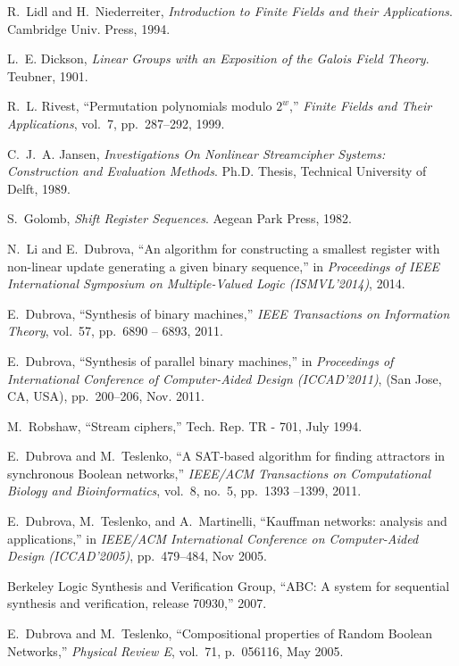 \documentclass[9pt,conference]{IEEEtran} \usepackage{times}
\begin{document}
\begin{thebibliography}{10}
R.~Lidl and H.~Niederreiter, {\em Introduction to Finite Fields and their
  Applications}.
\newblock Cambridge Univ. Press, 1994.

L.~E. Dickson, {\em Linear Groups with an Exposition of the Galois Field
  Theory}.
\newblock Teubner, 1901.

R.~L. Rivest, ``Permutation polynomials modulo $2^w$,'' {\em Finite Fields and
  Their Applications}, vol.~7, pp.~287--292, 1999.

C.~J.~A. Jansen, {\em Investigations On Nonlinear Streamcipher Systems:
  Construction and Evaluation Methods}.
\newblock Ph.D. Thesis, Technical University of Delft, 1989.

S.~Golomb, {\em Shift Register Sequences}.
\newblock Aegean Park Press, 1982.

N.~Li and E.~Dubrova, ``An algorithm for constructing a smallest register with
  non-linear update generating a given binary sequence,'' in {\em Proceedings
  of IEEE International Symposium on Multiple-Valued Logic (ISMVL'2014)}, 2014.

E.~Dubrova, ``Synthesis of binary machines,'' {\em IEEE Transactions on
  Information Theory}, vol.~57, pp.~6890 -- 6893, 2011.

E.~Dubrova, ``Synthesis of parallel binary machines,'' in {\em Proceedings of
  International Conference of Computer-Aided Design (ICCAD'2011)}, (San Jose,
  CA, USA), pp.~200--206, Nov. 2011.

M.~Robshaw, ``Stream ciphers,'' Tech. Rep. TR - 701, July 1994.

E.~Dubrova and M.~Teslenko, ``A {SAT}-based algorithm for finding attractors in
  synchronous {B}oolean networks,'' {\em IEEE/ACM Transactions on Computational
  Biology and Bioinformatics}, vol.~8, no.~5, pp.~1393 --1399, 2011.

E.~Dubrova, M.~Teslenko, and A.~Martinelli, ``Kauffman networks: analysis and
  applications,'' in {\em IEEE/ACM International Conference on Computer-Aided
  Design (ICCAD'2005)}, pp.~479--484, Nov 2005.

{Berkeley Logic Synthesis and Verification Group}, ``{ABC}: A system for
  sequential synthesis and verification, release 70930,'' 2007.

E.~Dubrova and M.~Teslenko, ``Compositional properties of {R}andom {B}oolean
  {N}etworks,'' {\em Physical Review E}, vol.~71, p.~056116, May 2005.


\end{thebibliography}
\end{document}
